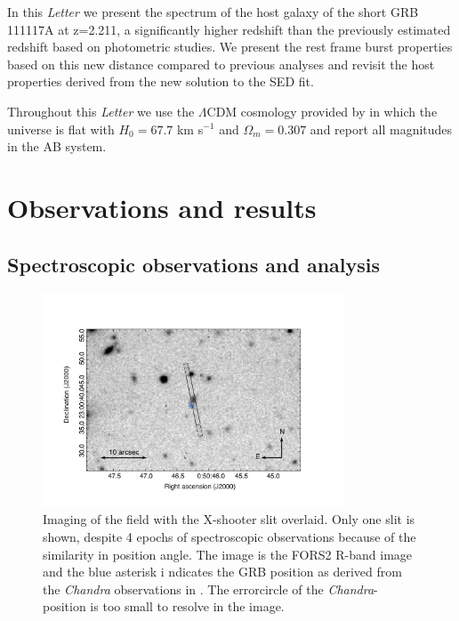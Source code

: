 \documentclass{aa}    %
\begin{document}
In this \emph{Letter} we present the spectrum of the host galaxy of the short
GRB 111117A at z=2.211, a significantly higher redshift than the previously
estimated redshift based on photometric studies. We present the rest frame burst
properties based on this new distance compared to previous analyses
\citep{Margutti2012,Sakamoto2013} and revisit the host properties derived from
the new solution to the SED fit. %

Throughout this \emph{Letter} we use the $\Lambda$CDM cosmology provided by
\citet{Planck2015} in which the universe is flat with $H_0 = 67.7$ km s$^{-1}$
and $\Omega_m = 0.307$ and report all magnitudes in the AB system.


\section{Observations and results}

\subsection{Spectroscopic observations and analysis}

\begin{figure}
	\centering
	\includegraphics[width=9cm]{figures/GRB111117A_spec_obs.pdf}
	\caption{Imaging of the field with the X-shooter slit overlaid. Only one slit is shown, despite 4 epochs of spectroscopic observations because of the similarity in position angle. The image is the FORS2 R-band image and%
	the blue asterisk i ndicates the GRB position as derived from the \emph{Chandra} observations in \citet{Sakamoto2013}. The errorcircle of the \emph{Chandra}-position is too small to resolve in the image.}
	\label{fig:spec_setup}
\end{figure}
\end{document}
